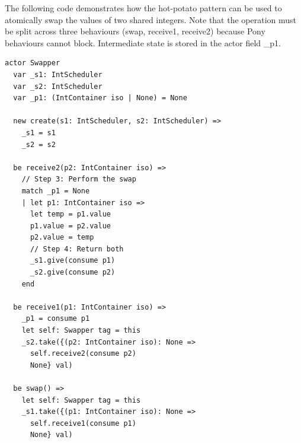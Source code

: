 The following code demonstrates how the hot-potato pattern can be used to atomically swap the values of two shared integers. Note that the operation must be split across three behaviours (\textsf{swap}, \textsf{receive1}, \textsf{receive2}) because Pony behaviours cannot block. Intermediate state is stored in the actor field \textsf{\_p1}.
\begin{verbatim}
actor Swapper
  var _s1: IntScheduler
  var _s2: IntScheduler
  var _p1: (IntContainer iso | None) = None

  new create(s1: IntScheduler, s2: IntScheduler) =>
    _s1 = s1
    _s2 = s2

  be receive2(p2: IntContainer iso) =>
    // Step 3: Perform the swap
    match _p1 = None
    | let p1: IntContainer iso =>
      let temp = p1.value
      p1.value = p2.value
      p2.value = temp
      // Step 4: Return both
      _s1.give(consume p1)
      _s2.give(consume p2)
    end

  be receive1(p1: IntContainer iso) =>
    _p1 = consume p1
    let self: Swapper tag = this
    _s2.take({(p2: IntContainer iso): None =>
      self.receive2(consume p2)
      None} val)

  be swap() =>
    let self: Swapper tag = this
    _s1.take({(p1: IntContainer iso): None =>
      self.receive1(consume p1)
      None} val)
\end{verbatim}

